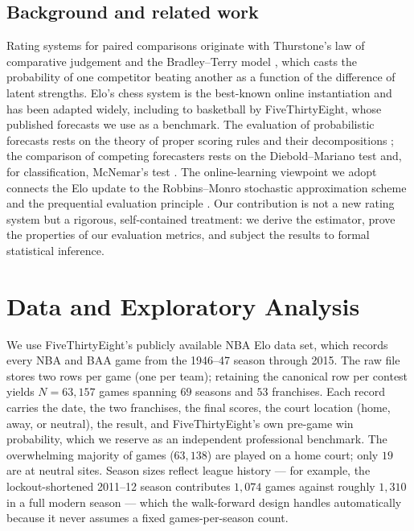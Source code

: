 \documentclass[11pt]{article}
\begin{document}
\subsection{Background and related work}
Rating systems for paired comparisons originate with Thurstone's law of
comparative judgement and the Bradley--Terry model \cite{bt}, which casts the
probability of one competitor beating another as a function of the difference of
latent strengths. Elo's chess system \cite{elo} is the best-known online
instantiation and has been adapted widely, including to basketball by
FiveThirtyEight, whose published forecasts we use as a benchmark. The
evaluation of probabilistic forecasts rests on the theory of proper scoring rules
\cite{brier, gneiting} and their decompositions \cite{murphy}; the comparison of
competing forecasters rests on the Diebold--Mariano test \cite{dm} and, for
classification, McNemar's test \cite{mcnemar}. The online-learning viewpoint we
adopt connects the Elo update to the Robbins--Monro stochastic approximation
scheme \cite{robbins} and the prequential evaluation principle \cite{dawid}. Our
contribution is not a new rating system but a rigorous, self-contained treatment:
we derive the estimator, prove the properties of our evaluation metrics, and
subject the results to formal statistical inference.

\section{Data and Exploratory Analysis}
We use FiveThirtyEight's publicly available NBA Elo data set, which records every
NBA and BAA game from the 1946--47 season through 2015. The raw file stores two
rows per game (one per team); retaining the canonical row per contest yields
$N = 63{,}157$ games spanning $69$ seasons and $53$ franchises. Each record
carries the date, the two franchises, the final scores, the court location
(home, away, or neutral), the result, and FiveThirtyEight's own pre-game win
probability, which we reserve as an independent professional benchmark. The
overwhelming majority of games ($63{,}138$) are played on a home court; only $19$
are at neutral sites. Season sizes reflect league history --- for example, the
lockout-shortened 2011--12 season contributes $1{,}074$ games against roughly
$1{,}310$ in a full modern season --- which the walk-forward design handles
automatically because it never assumes a fixed games-per-season count.
\end{document}
